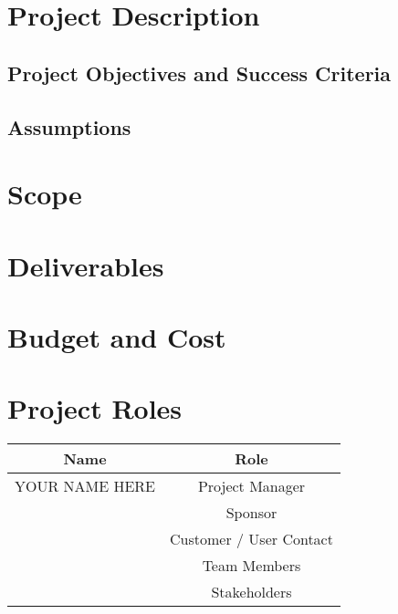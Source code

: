 \documentclass[12pt]{charter}
\begin{document}
\maketitle
\thispagestyle{empty}
\newpage

\section*{Project Description}
\label{sec:description}

	\subsection*{Project Objectives and Success Criteria}
	\label{subsec:objandsuccess}
	
	\subsection*{Assumptions}
	\label{subsec:assumptions}

\section*{Scope}
\label{sec:scope}

\section*{Deliverables}
\label{sec:deliverables}

\section*{Budget and Cost}
\label{sec:budgetcost}

\section*{Project Roles}
\label{sec:roles}
\begin{table}[h]
  \label{tbl:roles}
  \begin{center}
    \begin{tabular}{c|c}
      Name & Role\\\hline
      YOUR NAME HERE & Project Manager\\\hline
      & Sponsor\\\hline
      & Customer / User Contact\\\hline
      & Team Members\\\hline
      & Stakeholders\\\hline
    \end{tabular}
  \end{center}
\end{table}
\end{document}
